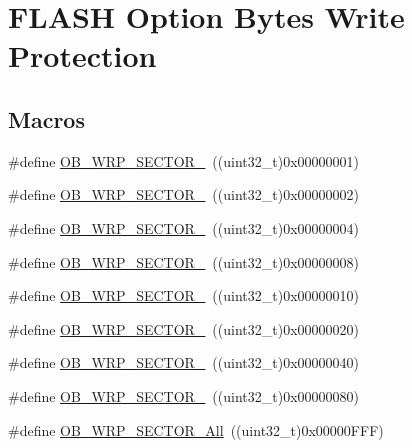 \hypertarget{group___f_l_a_s_h_ex___option___bytes___write___protection}{}\section{F\+L\+A\+SH Option Bytes Write Protection}
\label{group___f_l_a_s_h_ex___option___bytes___write___protection}
\subsection*{Macros}
\begin{DoxyCompactItemize}
\item 
\#define \hyperlink{group___f_l_a_s_h_ex___option___bytes___write___protection_gaa9a84eab02b9e32d4d12e30eae731d0f}{O\+B\+\_\+\+W\+R\+P\+\_\+\+S\+E\+C\+T\+O\+R\+\_}~((uint32\+\_\+t)0x00000001)
\item 
\#define \hyperlink{group___f_l_a_s_h_ex___option___bytes___write___protection_ga3f57a106dc14c2b9806e5311e96031d6}{O\+B\+\_\+\+W\+R\+P\+\_\+\+S\+E\+C\+T\+O\+R\+\_}~((uint32\+\_\+t)0x00000002)
\item 
\#define \hyperlink{group___f_l_a_s_h_ex___option___bytes___write___protection_gad8b13ac3000514a6a05ff2306c657a76}{O\+B\+\_\+\+W\+R\+P\+\_\+\+S\+E\+C\+T\+O\+R\+\_}~((uint32\+\_\+t)0x00000004)
\item 
\#define \hyperlink{group___f_l_a_s_h_ex___option___bytes___write___protection_ga93c4703a5aa2f3348ca7f394e9b8ad7c}{O\+B\+\_\+\+W\+R\+P\+\_\+\+S\+E\+C\+T\+O\+R\+\_}~((uint32\+\_\+t)0x00000008)
\item 
\#define \hyperlink{group___f_l_a_s_h_ex___option___bytes___write___protection_gadcb0d55662ead30d4d92dde1ff6ecc8f}{O\+B\+\_\+\+W\+R\+P\+\_\+\+S\+E\+C\+T\+O\+R\+\_}~((uint32\+\_\+t)0x00000010)
\item 
\#define \hyperlink{group___f_l_a_s_h_ex___option___bytes___write___protection_ga53c67ee41ff1cc7df79f5c73b9b7ed96}{O\+B\+\_\+\+W\+R\+P\+\_\+\+S\+E\+C\+T\+O\+R\+\_}~((uint32\+\_\+t)0x00000020)
\item 
\#define \hyperlink{group___f_l_a_s_h_ex___option___bytes___write___protection_ga08b2867102a08b114d45598dfc7915d5}{O\+B\+\_\+\+W\+R\+P\+\_\+\+S\+E\+C\+T\+O\+R\+\_}~((uint32\+\_\+t)0x00000040)
\item 
\#define \hyperlink{group___f_l_a_s_h_ex___option___bytes___write___protection_ga7de707c6772bb3caa72e6d87759ab57e}{O\+B\+\_\+\+W\+R\+P\+\_\+\+S\+E\+C\+T\+O\+R\+\_}~((uint32\+\_\+t)0x00000080)
\item 
\#define \hyperlink{group___f_l_a_s_h_ex___option___bytes___write___protection_gaf120263891bca013cf4a9f64ac57b941}{O\+B\+\_\+\+W\+R\+P\+\_\+\+S\+E\+C\+T\+O\+R\+\_\+\+All}~((uint32\+\_\+t)0x00000\+F\+F\+F)
\end{DoxyCompactItemize}


